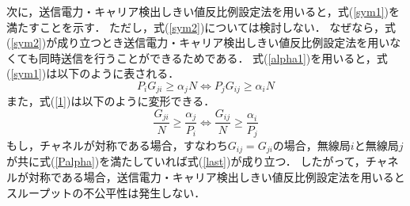 \documentclass[master]{kuisthesis}		%
\begin{document}
次に，送信電力・キャリア検出しきい値反比例設定法を用いると，式(\ref{sym1})を満たすことを示す．
ただし，式(\ref{sym2})については検討しない．
なぜなら，式(\ref{sym2})が成り立つとき送信電力・キャリア検出しきい値反比例設定法を用いなくても同時送信を行うことができるためである．
式(\ref{alpha1})を用いると，式(\ref{sym1})は以下のように表される．
\begin{equation}
\label{1}
 P_i G_{ji} \geq \alpha_jN  \Leftrightarrow   P_j G_{ij} \geq \alpha_iN
\end{equation}
また，式(\ref{1})は以下のように変形できる．
\begin{equation}
\label{last}
\frac{G_{ji}}{N} \geq \frac{\alpha_j}{P_i}  \Leftrightarrow  \frac{G_{ij}}{N} \geq \frac{\alpha_i}{P_j}
\end{equation}
もし，チャネルが対称である場合，すなわち$G_{ij}=G_{ji}$の場合，無線局$i$と無線局$j$が共に式(\ref{Palpha})を満たしていれば式(\ref{last})が成り立つ．
したがって，チャネルが対称である場合，送信電力・キャリア検出しきい値反比例設定法を用いるとスループットの不公平性は発生しない．
\end{document}
